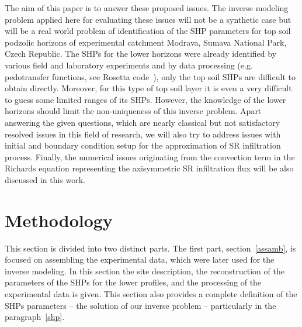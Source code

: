 \documentclass[review]{myarticle}
\begin{document}
The aim of this paper is to answer these proposed issues. The inverse modeling problem applied here for evaluating these issues will not be a synthetic case but will be a real world problem of identification of the SHP parameters for top soil podzolic horizons of experimental catchment Modrava, Sumava National Park, Czech Republic.  The SHPs for the lower horizons were already identified by various field and laboratory experiments and by data processing (e.g. pedotransfer functions, see Rosetta code~\citep{Schaap}), only the top soil SHPs are difficult to  obtain directly. Moreover, for this type of top soil layer it is even a very difficult to guess some limited ranges of its SHPs. However, the knowledge of the lower horizons should limit the non-uniqueness of this inverse problem. Apart answering the given questions, which are nearly classical but not satisfactory resolved issues in this field of research, we will also try to address issues with initial and boundary condition setup for the approximation of SR infiltration process. Finally, the numerical issues originating from the convection term in the Richards equation representing the axisymmetric SR infiltration flux will be also discussed in this work.









\section{Methodology}%
\label{metodo}


This section is divided into two distinct parts. The first part, section~\ref{assamb}, is focused on assembling the experimental data, which were later used for the inverse modeling. In this section the site description, the reconstruction of the parameters of the SHPs for the lower profiles, and the processing of the experimental data is given.   This section also provides a complete definition of the SHPs parameters -- the solution of our inverse problem -- particularly in the paragraph~\ref{shp}.
\end{document}
